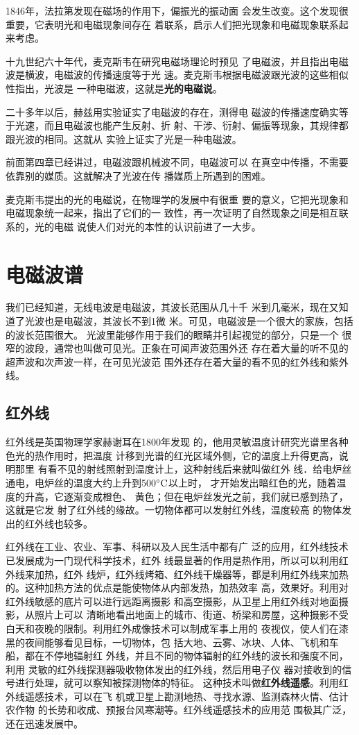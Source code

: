 1846年，法拉第发现在磁场的作用下，偏振光的振动面
会发生改变。这个发现很重要，它表明光和电磁现象间存在
着联系，启示人们把光现象和电磁现象联系起来考虑。

十九世纪六十年代，麦克斯韦在研究电磁场理论时预见
了电磁波，并且指出电磁波是横波，电磁波的传播速度等于光
速。麦克斯韦根据电磁波跟光波的这些相似性指出，光波是
一种电磁波，这就是\textbf{光的电磁说}。

二十多年以后，赫兹用实验证实了电磁波的存在，测得电
磁波的传播速度确实等于光速，而且电磁波也能产生反射、折
射、干涉、衍射、偏振等现象，其规律都跟光波的相同。这就从
实验上证实了光是一种电磁波。

前面第四章已经讲过，电磁波跟机械波不同，电磁波可以
在真空中传播，不需要依靠别的媒质。这就解决了光波在传
播媒质上所遇到的困难。

麦克斯韦提出的光的电磁说，在物理学的发展中有很重
要的意义，它把光现象和电磁现象统一起来，指出了它们的一
致性，再一次证明了自然现象之间是相互联系的，光的电磁
说使人们对光的本性的认识前进了一大步。

\section{电磁波谱}
我们已经知道，无线电波是电磁波，其波长范围从几十千
米到几毫米，现在又知道了光波也是电磁波，其波长不到1微
米。可见，电磁波是一个很大的家族，包括的波长范围很大。
光波里能够作用于我们的眼睛并引起视觉的部分，只是一个
很窄的波段，通常也叫做可见光。正象在可闻声波范围外还
存在着大量的听不见的超声波和次声波一样，在可见光波范
围外还存在着大量的看不见的红外线和紫外线。

\subsection{红外线}

红外线是英国物理学家赫谢耳在1800年发现
的，他用灵敏温度计研究光谱里各种色光的热作用时，把温度
计移到光谱的红光区域外侧，它的温度上升得更高，说明那里
有看不见的射线照射到温度计上，这种射线后来就叫做红外
线．给电炉丝通电，电炉丝的温度大约上升到500$^{\circ}{\rm C}$以上时，
才开始发出暗红色的光，随着温度的升高，它逐渐变成橙色、
黄色；但在电炉丝发光之前，我们就已感到热了，这就是它发
射了红外线的缘故。一切物体都可以发射红外线，温度较高
的物体发出的红外线也较多。

红外线在工业、农业、军事、科研以及人民生活中都有广
泛的应用，红外线技术已发展成为一门现代科学技术，红外
线最显著的作用是热作用，所以可以利用红外线来加热，红外
线炉，红外线烤箱、红外线干燥器等，都是利用红外线来加热
的。这种加热方法的优点是能使物体从内部发热，加热效率
高，效果好。利用对红外线敏感的底片可以进行远距离摄影
和高空摄影，从卫星上用红外线对地面摄影，从照片上可以
清晰地看出地面上的城市、街道、桥梁和房屋，这种摄影不受
白天和夜晚的限制。利用红外成像技术可以制成军事上用的
夜视仪，使人们在漆黑的夜间能够看见目标，一切物体，包
括大地、云雾、冰块、人体、飞机和车船，都在不停地辐射红
外线，并且不同的物体辐射的红外线的波长和强度不同，利用
灵敏的红外线探测器吸收物体发出的红外线，然后用电子仪
器对接收到的信号进行处理，就可以察知被探测物体的特征。
这种技术叫做\textbf{红外线遥感}。利用红外线遥感技术，可以在飞
机或卫星上勘测地热、寻找水源、监测森林火情、估计农作物
的长势和收成、预报台风寒潮等。红外线遥感技术的应用范
围极其广泛，还在迅速发展中。


